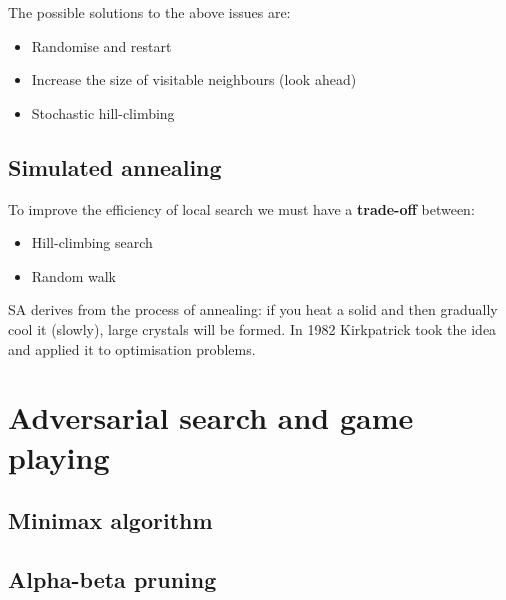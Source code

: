 \documentclass[a4paper, 11pt]{article}
\begin{document}
The possible solutions to the above issues are:
\begin{itemize}
  \item Randomise and restart
  \item Increase the size of visitable neighbours (look ahead)
  \item Stochastic hill-climbing
\end{itemize}

\subsection*{Simulated annealing}
To improve the efficiency of local search we must have a \textbf{trade-off} between:
\begin{itemize}
  \item Hill-climbing search
  \item Random walk
\end{itemize}

SA derives from the process of annealing: if you heat a solid and then gradually cool it (slowly), large crystals will be formed.
In 1982 Kirkpatrick took the idea and applied it to optimisation problems.

\section{Adversarial search and game playing}

\subsection*{Minimax algorithm}

\subsection*{Alpha-beta pruning}
\end{document}
